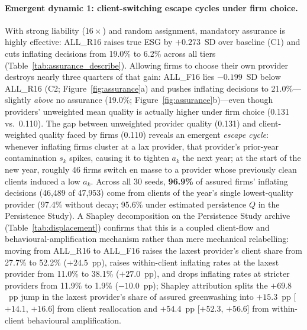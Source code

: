 \documentclass[11pt]{article}
\begin{document}
\paragraph{Emergent dynamic 1: client-switching escape cycles under firm choice.}
With strong liability ($16\times$) and random assignment, mandatory assurance is highly effective: ALL\_R16 raises true ESG by $+0.273$~SD over baseline (C1) and cuts inflating decisions from 19.0\% to 6.2\% across all tiers (Table~\ref{tab:assurance_describe}). Allowing firms to choose their own provider destroys nearly three quarters of that gain: ALL\_F16 lies $-0.199$~SD below ALL\_R16 (C2; Figure~\ref{fig:assurance}a) and pushes inflating decisions to 21.0\%---slightly \emph{above} no assurance (19.0\%; Figure~\ref{fig:assurance}b)---even though providers' unweighted mean quality is actually higher under firm choice (0.131 vs.\ 0.110). The gap between unweighted provider quality (0.131) and client-weighted quality faced by firms (0.110) reveals an emergent \emph{escape cycle}: whenever inflating firms cluster at a lax provider, that provider's prior-year contamination $s_k$ spikes, causing it to tighten $a_k$ the next year; at the start of the new year, roughly 46 firms switch en masse to a provider whose previously clean clients induced a low $a_k$. Across all 30 seeds, \textbf{96.9\%} of assured firms' inflating decisions (46,489 of 47,953) come from clients of the year's single lowest-quality provider (97.4\% without decay; 95.6\% under estimated persistence $Q$ in the Persistence Study). A Shapley decomposition on the Persistence Study archive (Table~\ref{tab:displacement}) confirms that this is a coupled client-flow and behavioural-amplification mechanism rather than mere mechanical relabelling: moving from ALL\_R16 to ALL\_F16 raises the laxest provider's client share from 27.7\% to 52.2\% ($+24.5$~pp), raises within-client inflating rates at the laxest provider from 11.0\% to 38.1\% ($+27.0$~pp), and drops inflating rates at stricter providers from 11.9\% to 1.9\% ($-10.0$~pp); Shapley attribution splits the $+69.8$~pp jump in the laxest provider's share of assured greenwashing into $+15.3$~pp [$+14.1$, $+16.6$] from client reallocation and $+54.4$~pp [$+52.3$, $+56.6$] from within-client behavioural amplification.
\end{document}

